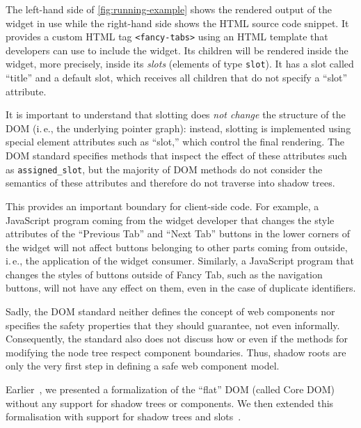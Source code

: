 \documentclass[10pt,DIV16,a4paper,abstract=true,twoside=semi,openright]
{scrreprt}
\def\inlinehtml{\lstinline[style=html, columns=fullflexible]}
\newcommand{\ie}{i.\,e.\xspace}
\begin{document}
The left-hand side of \autoref{fig:running-example} shows the rendered
output of the widget in use while the right-hand side shows the HTML
source code snippet.  It provides a custom HTML tag
\inlinehtml{<fancy-tabs>} using an HTML template that developers can
use to include the widget. Its children will be rendered inside the
widget, more precisely, inside its \emph{slots} (elements of type
\inlinehtml{slot}).  It has a slot called ``title'' and a default
slot, which receives all children that do not specify a ``slot''
attribute.

It is important to understand that slotting does \emph{not change} the
structure of the DOM (\ie, the underlying pointer graph): instead,
slotting is implemented using special element attributes such as
``slot,'' which control the final rendering. The DOM standard
specifies methods that inspect the effect of these attributes such as
\texttt{assigned\_slot}, but the majority of DOM methods do not
consider the semantics of these attributes and therefore do not
traverse into shadow trees.

This provides an important boundary for client-side code. For example,
a JavaScript program coming from the widget developer that changes the
style attributes of the ``Previous Tab'' and ``Next Tab'' buttons in the lower
corners of the widget will not affect buttons belonging to other parts
coming from outside, \ie, the application of the widget consumer.
Similarly, a JavaScript program that changes the styles of buttons
outside of Fancy Tab, such as the navigation buttons, will not have
any effect on them, even in the case of duplicate identifiers.

Sadly, the DOM standard neither defines the concept of web components
nor specifies the safety properties that they should guarantee, not
even informally. Consequently, the standard also does not discuss how
or even if the methods for modifying the node tree respect component
boundaries.  Thus, shadow roots are only the very first step in
defining a safe web component model.

Earlier~\cite{brucker.ea:core-dom:2018,brucker.ea:afp-core-dom:2018},
we presented a formalization of the ``flat'' DOM (called Core DOM)
without any support for shadow trees or components.  We then extended
this formalisation with support for shadow trees and
slots~\cite{brucker.ea:afp-shadow-dom:2020}.
\end{document}
